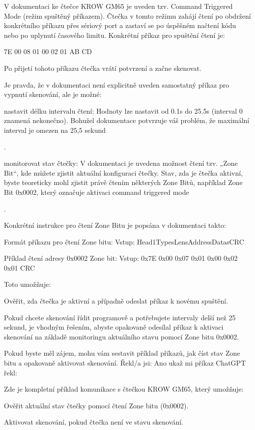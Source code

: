 V dokumentaci ke čtečce KROW GM65 je uveden tzv. Command Triggered Mode (režim spuštěný příkazem). Čtečka v tomto režimu zahájí čtení po obdržení konkrétního příkazu přes sériový port a zastaví se po úspěšném načtení kódu nebo po uplynutí časového limitu. Konkrétní příkaz pro spuštění čtení je:

7E 00 08 01 00 02 01 AB CD

Po přijetí tohoto příkazu čtečka vrátí potvrzení a začne skenovat.

Je pravda, že v dokumentaci není explicitně uveden samostatný příkaz pro vypnutí skenování, ale je možné:

    nastavit délku intervalu čtení: Hodnoty lze nastavit od 0.1s do 25.5s (interval 0 znamená nekonečno). Bohužel dokumentace potvrzuje váš problém, že maximální interval je omezen na 25,5 sekund​

.

monitorovat stav čtečky: V dokumentaci je uvedena možnost čtení tzv. „Zone Bit“, kde můžete zjistit aktuální konfiguraci čtečky. Stav, zda je čtečka aktivní, byste teoreticky mohl zjistit právě čtením některých Zone Bitů, například Zone Bit 0x0002, který označuje aktivaci command triggered mode​

    .

Konkrétní instrukce pro čtení Zone Bitu je popsána v dokumentaci takto:

Formát příkazu pro čtení Zone bitu:
Vstup: {Head1}{Types}{Lens}{Address}{Datas}{CRC}

Příklad čtení adresy 0x0002 Zone bit:
Vstup: 0x7E 0x00 0x07 0x01 0x00 0x02 0x01 CRC

Toto umožňuje:

    Ověřit, zda čtečka je aktivní a případně odeslat příkaz k novému spuštění.

Pokud chcete skenování řídit programově a potřebujete intervaly delší než 25 sekund, je vhodným řešením, abyste opakovaně odesílal příkaz k aktivaci skenování na základě monitoringu aktuálního stavu pomocí Zone bitu 0x0002.

Pokud byste měl zájem, mohu vám sestavit příklad příkazů, jak číst stav Zone bitu a opakovaně aktivovat skenování.
Řekl/a jsi:
Ano ukaž mi příkaz
ChatGPT řekl:

Zde je kompletní příklad komunikace s čtečkou KROW GM65, který umožňuje:

    Ověřit aktuální stav čtečky pomocí čtení Zone bitu (0x0002).

    Aktivovat skenování, pokud čtečka není ve stavu skenování.

